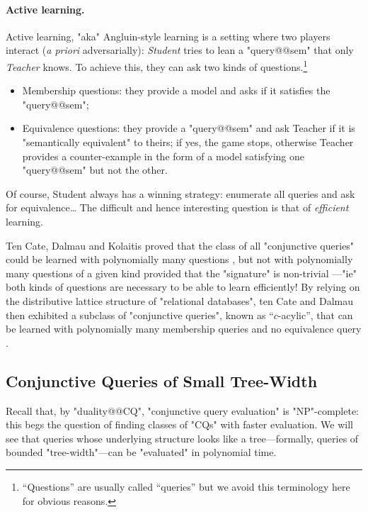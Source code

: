 \paragraph*{Active learning.}
Active learning, "aka" Angluin-style learning is a setting where
two players interact (\emph{a priori} adversarially): \emph{Student} tries
to lean a "query@@sem" that only \emph{Teacher} knows. To achieve this,
they can ask two kinds of questions.\footnote[][-1.5cm]{``Questions'' are usually called 
``queries'' but we avoid this terminology here for obvious reasons.}
\begin{itemize}
	\item Membership questions: they provide a model and asks if it satisfies the "query@@sem";
	\item Equivalence questions: they provide a "query@@sem" and ask Teacher if
		it is "semantically equivalent" to theirs; if yes, the game stops, otherwise
		Teacher provides a counter-example in the form of a model satisfying
		one "query@@sem" but not the other.
\end{itemize}
Of course, Student always has a winning strategy: enumerate all queries
and ask for equivalence… The difficult and hence interesting question
is that of \emph{efficient} learning.

Ten Cate, Dalmau and Kolaitis proved that 
the class of all "conjunctive queries" could be
learned with polynomially many questions \cite[Theorem~A]{tenCateDalmauKolaitis2013Learning},
but not with polynomially many questions of a given kind provided
that the "signature" is non-trivial \cite[Theorem~B]{tenCateDalmauKolaitis2013Learning}---"ie"
both kinds of questions are necessary to be able to learn efficiently!
By relying on the distributive lattice structure of "relational databases",
ten Cate and Dalmau then exhibited a subclass of "conjunctive queries",
known as ``$c$-acylic'', that can be learned with
polynomially many membership queries
and no equivalence query \cite[Theorem~5.2]{tenCateDalmau2021ActiveLearning}.


\subsection{Conjunctive Queries of Small Tree-Width}
\label{sec:prelim-db-tw}

Recall that, by "duality@@CQ", "conjunctive query evaluation" is "NP"-complete:
this begs the question of finding classes of "CQs" with faster evaluation.
We will see that queries whose underlying structure looks like
a tree---formally, queries of bounded "tree-width"---can be "evaluated" in polynomial time.

